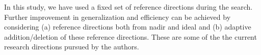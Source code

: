 In this study, we have used a fixed set of reference directions during the search. Further improvement in generalization and efficiency can be achieved by considering (a) reference directions both from nadir and ideal and (b) adaptive addition/deletion of these reference directions. These are some of the the current research directions pursued by the authors.  


 






